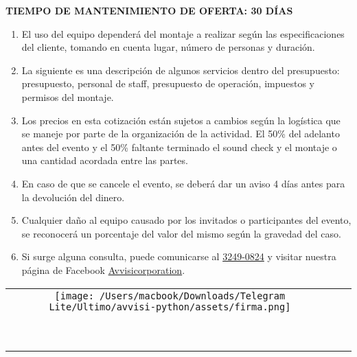 \documentclass[a4paper,12pt]{article}
\begin{document}
\newpage

\vspace*{1.2cm}

\noindent \textbf{TIEMPO DE MANTENIMIENTO DE OFERTA: 30 DÍAS}

\begin{enumerate}[itemsep=0.2em]
    \item El uso del equipo dependerá del montaje a realizar según las especificaciones del cliente, tomando en cuenta lugar, número de personas y duración.
    \item La siguiente es una descripción de algunos servicios dentro del presupuesto: presupuesto, personal de staff, presupuesto de operación, impuestos y permisos del montaje.
    \item Los precios en esta cotización están sujetos a cambios según la logística que se maneje por parte de la organización de la actividad. El 50\% del adelanto antes del evento y el 50\% faltante terminado el sound check y el montaje o una cantidad acordada entre las partes.
    \item En caso de que se cancele el evento, se deberá dar un aviso 4 días antes para la devolución del dinero.
    \item Cualquier daño al equipo causado por los invitados o participantes del evento, se reconocerá un porcentaje del valor del mismo según la gravedad del caso.
    \item Si surge alguna consulta, puede comunicarse al \href{tel:+50432490824}{3249-0824} y visitar nuestra página de Facebook \href{https://www.facebook.com/Avvisicorporation/}{Avvisicorporation}.
\end{enumerate}



\begin{center}
    \begin{tabular}{c@{\hskip 2cm}c}
        \texttt{[image: /Users/macbook/Downloads/Telegram Lite/Ultimo/avvisi-python/assets/firma.png]} & \hspace*{2cm} 
         
        \\[-1.95cm] %
        & \underline{ \hspace{6cm} }\,\
    \end{tabular}
\end{center}
\end{document}
